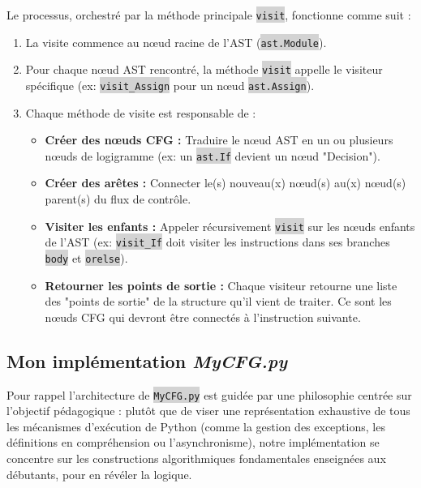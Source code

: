\documentclass[11pt,a4paper]{article}
\newcommand{\code}[1]{\colorbox{lightgray}{\texttt{\small #1}}}
\begin{document}
Le processus, orchestré par la méthode principale \code{visit}, fonctionne comme suit :
\begin{enumerate}
    \item La visite commence au nœud racine de l'AST (\code{ast.Module}).
    \item Pour chaque nœud AST rencontré, la méthode \code{visit} appelle le visiteur spécifique (ex: \code{visit\_Assign} pour un nœud \code{ast.Assign}).
    \item Chaque méthode de visite est responsable de :
    \begin{itemize}
        \item \textbf{Créer des nœuds CFG :} Traduire le nœud AST en un ou plusieurs nœuds de logigramme (ex: un \code{ast.If} devient un nœud "Decision").
        \item \textbf{Créer des arêtes :} Connecter le(s) nouveau(x) nœud(s) au(x) nœud(s) parent(s) du flux de contrôle.
        \item \textbf{Visiter les enfants :} Appeler récursivement \code{visit} sur les nœuds enfants de l'AST (ex: \code{visit\_If} doit visiter les instructions dans ses branches \code{body} et \code{orelse}).
        \item \textbf{Retourner les points de sortie :} Chaque visiteur retourne une liste des "points de sortie" de la structure qu'il vient de traiter. Ce sont les nœuds CFG qui devront être connectés à l'instruction suivante.
    \end{itemize}
\end{enumerate}


\subsection{Mon implémentation \textit{MyCFG.py}}

Pour rappel l'architecture de \code{MyCFG.py} est guidée par une philosophie centrée sur l'objectif pédagogique : plutôt que de viser une représentation exhaustive de tous les mécanismes d'exécution de Python (comme la gestion des exceptions, les définitions en compréhension ou l'asynchronisme), notre implémentation se concentre sur les constructions algorithmiques fondamentales enseignées aux débutants, pour en révéler la logique.
\end{document}
